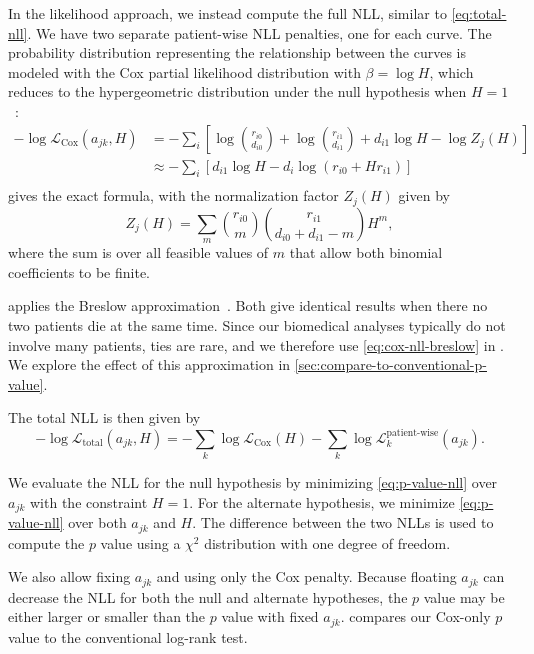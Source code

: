 \documentclass[article]{jss}
\begin{document}
In the likelihood approach, we instead compute the full NLL, similar to \cref{eq:total-nll}.  We have two separate patient-wise NLL penalties, one for each curve.  The probability distribution representing the relationship between the curves is modeled with the Cox partial likelihood distribution with \(\beta=\log{H}\), which reduces to the hypergeometric distribution under the null hypothesis when \(H=1\)~\citep{cox1972regression,breslow1974covariance}:
\begin{align}
-\log \mathcal{L}_{\text{Cox}}(a_{jk}, H)&=-\sum_i\left[\log\binom{r_{i0}}{d_{i0}}+\log\binom{r_{i1}}{d_{i1}}+d_{i1}\log H-\log Z_j(H)\right] \label{eq:cox-nll-exact}\\
&\approx-\sum_i \left[d_{i1} \log H - d_i \log\left(r_{i0} + H r_{i1}\right)\right] \label{eq:cox-nll-breslow}\\
\end{align}
 gives the exact formula, with the normalization factor \(Z_j(H)\) given by
\begin{equation}
Z_j(H) = \sum_{m}\binom{r_{i0}}{m}\binom{r_{i1}}{d_{i0}+d_{i1}-m}H^m,
\label{eq:cox-normalization}
\end{equation}
where the sum is over all feasible values of \(m\) that allow both binomial coefficients to be finite.

 applies the Breslow approximation~\citep{breslow1974covariance}.  Both give identical results when there no two patients die at the same time.  Since our biomedical analyses typically do not involve many patients, ties are rare, and we therefore use \cref{eq:cox-nll-breslow} in .  We explore the effect of this approximation in \cref{sec:compare-to-conventional-p-value}.

The total NLL is then given by
\begin{equation}
-\log \mathcal{L}_{\text{total}}(a_{jk}, H) = -\sum_{k}\log\mathcal{L}_\text{Cox}(H) - \sum_{k}\log\mathcal{L}_k^{\text{patient-wise}}(a_{jk}).
\label{eq:p-value-nll}
\end{equation}

We evaluate the NLL for the null hypothesis by minimizing \cref{eq:p-value-nll} over \(a_{jk}\) with the constraint \(H=1\).  For the alternate hypothesis, we minimize \cref{eq:p-value-nll} over both \(a_{jk}\) and \(H\).  The difference between the two NLLs is used to compute the \(p\) value using a \(\chi^2\) distribution with one degree of freedom.

We also allow fixing \(a_{jk}\) and using only the Cox penalty.  Because floating \(a_{jk}\) can decrease the NLL for both the null and alternate hypotheses, the \(p\) value may be either larger or smaller than the \(p\) value with fixed \(a_{jk}\).   compares our Cox-only \(p\) value to the conventional log-rank test.
\end{document}
